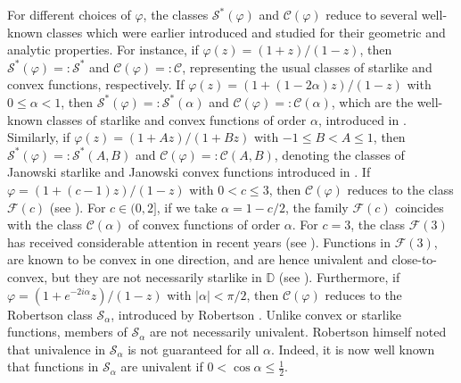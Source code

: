 \documentclass[a4paper,12pt]{amsart}
\theoremstyle{definition}
\newcounter {own}
\begin{document}
For different choices of $\varphi$, the classes $ \mathcal{S}^*(\varphi) $ and $\mathcal{C}(\varphi)$ reduce to several well-known classes which were earlier introduced and studied for their geometric and analytic properties. For instance, if $\varphi(z)=(1+z)/(1-z)$, then $\mathcal{S}^*(\varphi) =: \mathcal{S}^*$ and $\mathcal{C}(\varphi) =: \mathcal{C}$, representing the usual classes of starlike and convex functions, respectively.
If $\varphi(z)=(1+(1-2\alpha)z)/(1-z)$ with $0 \le \alpha < 1$, then $\mathcal{S}^*(\varphi) =: \mathcal{S}^*(\alpha)$ and $\mathcal{C}(\varphi) =: \mathcal{C}(\alpha)$, which are the well-known classes of starlike and convex functions of order $\alpha$, introduced in \cite{Robertson-1935}. Similarly, if $\varphi(z)=(1+Az)/(1+Bz)$ with $-1 \le B < A \le 1$, then $\mathcal{S}^*(\varphi) =: \mathcal{S}^*(A,B)$ and $\mathcal{C}(\varphi) =: \mathcal{C}(A,B)$, denoting the classes of Janowski starlike and Janowski convex functions introduced in \cite{Janowski1,Janowski2}.
If $\varphi=(1+(c-1)z)/(1-z)$ with $0<c\le 3$, then $\mathcal{C}(\varphi)$ reduces to the class $\mathcal{F}(c)$ (see \cite{Ponnusamy-Sharma- Wirths-2020}). For $c\in(0,2]$, if we take $\alpha = 1 - c/2$, the family \(\mathcal{F}(c)\) coincides with the class $\mathcal{C}(\alpha)$ of convex functions of order \(\alpha\). For \(c = 3\), the class \(\mathcal{F}(3)\) has received considerable attention in recent years (see \cite{Ponnusamy-Sahoo-Yanagihara-2014}). Functions in \(\mathcal{F}(3)\), are known to be convex in one direction, and are hence univalent and close-to-convex, but they are not necessarily starlike in \(\mathbb{D}\) (see \cite{Umezawa-1952}).
Furthermore, if $\varphi=(1+e^{-2i\alpha }z)/(1-z)$ with $|\alpha|<\pi/2$, then $\mathcal{C}(\varphi)$ reduces to the Robertson class $\mathcal{S}_\alpha$, introduced by Robertson \cite{Robertson-1969}. Unlike convex or starlike functions, members of \(\mathcal{S}_{\alpha}\) are not necessarily univalent. Robertson \cite{Robertson-1969} himself noted that univalence in \(\mathcal{S}_{\alpha}\) is not guaranteed for all \(\alpha\). Indeed, it is now well known that functions in \(\mathcal{S}_{\alpha}\) are univalent if $0 < \cos \alpha \leq \frac{1}{2}$.\\
\end{document}
